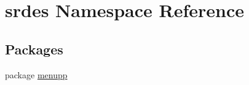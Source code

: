 \hypertarget{namespacesrdes}{\section{srdes \-Namespace \-Reference}
\label{namespacesrdes}
}
\subsection*{\-Packages}
\begin{DoxyCompactItemize}
\item 
package \hyperlink{namespacesrdes_1_1menupp}{menupp}
\end{DoxyCompactItemize}

